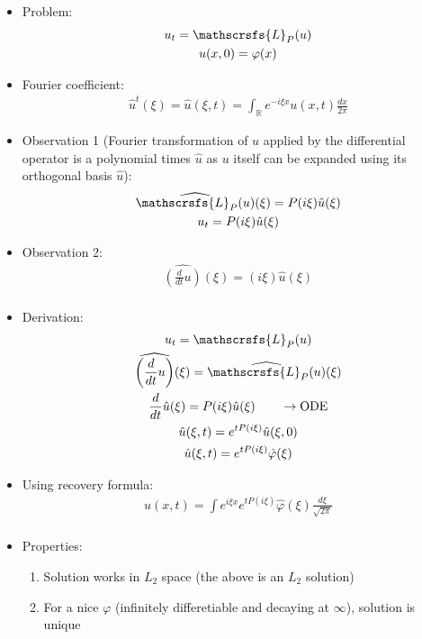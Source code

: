 \documentclass[12pt, a4paper]{article}
\begin{document}
\begin{itemize}
    \item Problem:
    \begin{gather*}
        u_t = \mathscrsfs{L}_P(u)\\
        u(x, 0) = \varphi(x)
    \end{gather*}
    \item Fourier coefficient:
    \begin{gather*}
        \hat{u}^t(\xi) = \hat{u}(\xi, t) = \int_\mathbb{R}e^{-i\xi x}u(x, t)\frac{dx}{2\pi}
    \end{gather*}
    \item Observation 1 (Fourier transformation of $u$ applied by the differential operator is a polynomial times $\hat{u}$ as $u$ itself can be expanded using its orthogonal basis $\hat{u}$):
    \begin{gather*}
        \widehat{\mathscrsfs{L}_P(u)}(\xi) = P(i\xi)\hat{u}(\xi)\\
        u_t = P(i\xi)\hat{u}(\xi)\\
    \end{gather*}
    \item Observation 2:
    \begin{gather*}
        \widehat{\left(\frac{d}{dt}u\right)}(\xi) = (i\xi)\hat{u}(\xi)\\
    \end{gather*}
    \item Derivation:
    \begin{gather*}
        u_t = \mathscrsfs{L}_P(u)\\
        \widehat{\left(\frac{d}{dt}u\right)}(\xi) = \widehat{\mathscrsfs{L}_P(u)}(\xi)\\
        \frac{d}{dt}\hat{u}(\xi) = P(i\xi)\hat{u}(\xi) \qquad \rightarrow \text{ODE}\\
        \hat{u}(\xi, t) = e^{tP(i\xi)}\hat{u}(\xi, 0)\\
        \hat{u}(\xi, t) = e^{tP(i\xi)}\hat{\varphi}(\xi)\\
    \end{gather*}
    \item Using recovery formula:
    \begin{gather*}
        u(x, t) = \int e^{i\xi x}e^{tP(i\xi)}\hat{\varphi}(\xi)\frac{d\xi}{\sqrt{2\pi}}\\
    \end{gather*}
    \item Properties:
    \begin{enumerate}
        \item Solution works in $L_2$ space (the above is an $L_2$ solution)
        \item For a nice $\varphi$ (infinitely differetiable and decaying at $\infty$), solution is unique\\
    \end{enumerate}
\end{itemize}
\end{document}

